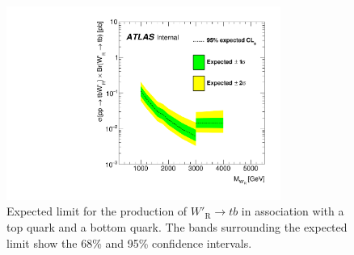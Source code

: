 \begin{figure}[H]
  \centering
  \includegraphics[width=0.8\textwidth]{images/ProfileLHFit/XSUpperLimits_Wp-RH.pdf}
  \caption{Expected limit for the production of $W'_{\text{R}}{\rightarrow}tb$ in association with a top quark and a bottom quark. The bands surrounding the expected limit show the 68\% and 95\% confidence intervals.}
  \label{fig:XSLimits_WpRH}
\end{figure}


